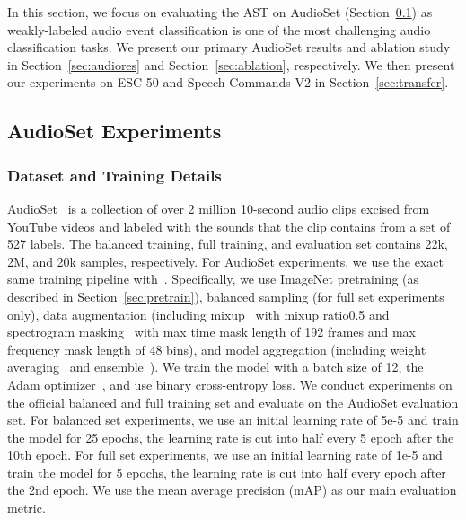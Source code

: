 \documentclass[a4paper]{article}
\begin{document}
In this section, we focus on evaluating the AST on AudioSet (Section~\ref{sec:audioset}) as weakly-labeled audio event classification is one of the most challenging audio classification tasks. We present our primary AudioSet results and ablation study in Section~\ref{sec:audiores} and Section~\ref{sec:ablation}, respectively. We then present our experiments on ESC-50 and Speech Commands V2 in Section~\ref{sec:transfer}.

\subsection{AudioSet Experiments}
\label{sec:audioset}
\subsubsection{Dataset and Training Details}
AudioSet~\cite{gemmeke2017audio} is a collection of over 2 million 10-second audio clips excised from YouTube videos and labeled with the sounds that the clip contains from a set of 527 labels. The balanced training, full training, and evaluation set contains 22k, 2M, and 20k samples, respectively. For AudioSet experiments, we use the exact same training pipeline with~\cite{gong2021psla}. Specifically, we use ImageNet pretraining (as described in Section~\ref{sec:pretrain}), balanced sampling (for full set experiments only), data augmentation (including mixup~\cite{tokozume2018learning} with mixup ratio0.5 and spectrogram masking~\cite{park2019specaugment} with max time mask length of 192 frames and max frequency mask length of 48 bins), and model aggregation (including weight averaging~\cite{izmailov2018averaging} and ensemble~\cite{breiman1996bagging}). We train the model with a batch size of 12, the Adam optimizer~\cite{kingma2015adam}, and use binary cross-entropy loss. We conduct experiments on the official balanced and full training set and evaluate on the AudioSet evaluation set. For balanced set experiments, we use an initial learning rate of 5e-5 and train the model for 25 epochs, the learning rate is cut into half every 5 epoch after the 10th epoch. For full set experiments, we use an initial learning rate of 1e-5 and train the model for 5 epochs, the learning rate is cut into half every epoch after the 2nd epoch. We use the mean average precision (mAP) as our main evaluation metric.
\end{document}
